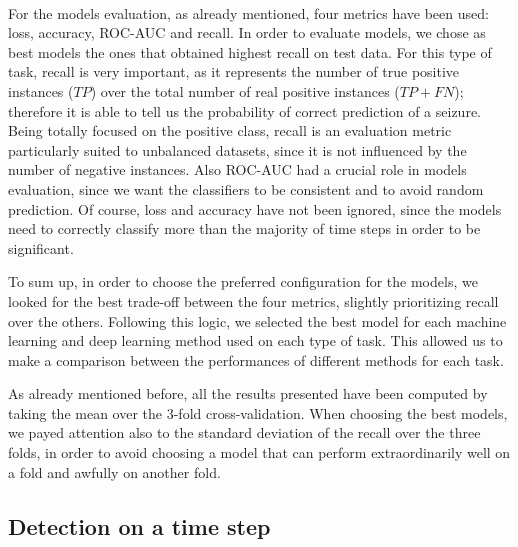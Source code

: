 \paragraph{} For the models evaluation, as already mentioned, four metrics have been used: loss, accuracy, ROC-AUC and recall. In order to evaluate models, we chose as best models the ones that obtained highest recall on test data. For this type of task, recall is very important, as it represents the number of true positive instances ($TP$) over the total number of real positive instances ($TP+FN$); therefore it is able to tell us the probability of correct prediction of a seizure. Being totally focused on the positive class, recall is an evaluation metric particularly suited to unbalanced datasets, since it is not influenced by the number of negative instances. Also ROC-AUC had a crucial role in models evaluation, since we want the classifiers to be consistent and to avoid random prediction. Of course, loss and accuracy have not been ignored, since the models need to correctly classify more than the majority of time steps in order to be significant.

To sum up, in order to choose the preferred configuration for the models, we looked for the best trade-off between the four metrics, slightly prioritizing recall over the others. Following this logic, we selected the best model for each machine learning and deep learning method used on each type of task. This allowed us to make a comparison between the performances of different methods for each task.

As already mentioned before, all the results presented have been computed by taking the mean over the 3-fold cross-validation. When choosing the best models, we payed attention also to the standard deviation of the recall over the three folds, in order to avoid choosing a model that can perform extraordinarily well on a fold and awfully on another fold.


\subsection{Detection on a time step}
